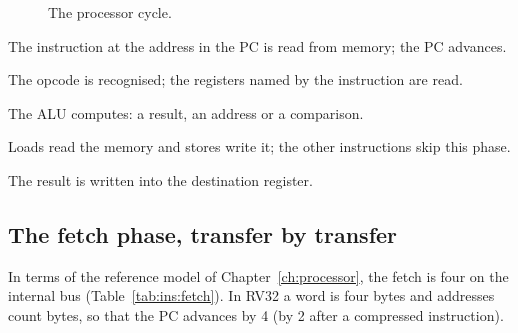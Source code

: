 \begin{figure}[htb]
\centering
{}
\caption{The processor cycle.}
\label{fig:ins:cycle}
\end{figure}

\begin{description}[style=nextline,leftmargin=1.5em]
\item[Fetch.] The instruction at the address in the PC is read from memory;
  the PC advances.
\item[Decode.] The opcode is recognised; the registers named by the
  instruction are read.
\item[Execute.] The ALU computes: a result, an address or a comparison.
\item[Memory.] Loads read the memory and stores write it; the other
  instructions skip this phase.
\item[Write back.] The result is written into the destination register.
\end{description}

\subsection{The fetch phase, transfer by transfer}

In terms of the reference model of Chapter~\ref{ch:processor}, the fetch is
four  on the internal bus
(Table~\ref{tab:ins:fetch}). In RV32 a word is four bytes and addresses
count bytes, so that the PC advances by 4 (by 2 after a compressed
instruction).

